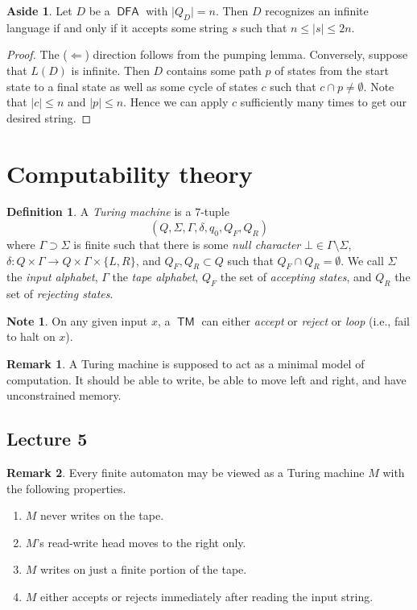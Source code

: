 \documentclass[10pt,letterpaper,cm]{nupset}
\theoremstyle{definition}
\newtheorem*{definition}{Definition}
\newtheorem{note}{Note}
\newtheorem{remark}{Remark}
\newtheorem*{aside}{Aside}
\newcommand{\1}{\mathbf{1}}
\newcommand{\0}{\vec 0}
\DeclareMathOperator{\TM}{\mathsf{TM}}
\DeclareMathOperator{\DFA}{\mathsf{DFA}}
\begin{document}
\begin{aside}
Let $D$ be a $\DFA$ with $\lvert{Q_D}\rvert =n$. Then $D$ recognizes an infinite language if and only if it accepts some string $s$ such that $n\leq \lvert{s}\rvert \leq 2n$.
\end{aside}
\begin{proof}
The ($\Longleftarrow$) direction follows from the pumping lemma. Conversely, suppose that $L(D)$ is infinite. Then $D$ contains some path $p$ of states from the start state to a final state as well as some cycle of states $c$ such that $c \cap p \ne \emptyset$. Note that $\lvert{c}\rvert \leq n$ and $\lvert{p}\rvert \leq n$. Hence we can apply $c$ sufficiently many times to get our desired string.
\end{proof}

\section{Computability theory}

\begin{definition}
A \textit{Turing machine} is a $7$-tuple $$(Q, \Sigma, \Gamma, \delta, q_0, Q_F, Q_R)$$ where $\Gamma \supset \Sigma$ is finite such that there is some \textit{null character} $\bot \in \Gamma \setminus \Sigma$, $\delta : Q\times \Gamma \to Q \times \Gamma \times \{L, R\}$, and $Q_F, Q_R \subset Q$ such that $Q_F \cap Q_R = \emptyset$. We call $\Sigma$ the \textit{input alphabet}, $\Gamma$ the \textit{tape alphabet}, $Q_F$ the set of \textit{accepting states}, and $Q_R$ the set of \textit{rejecting states}.
\end{definition}

\begin{note}
On any given input $x$, a $\TM$ can either \textit{accept} or \textit{reject} or \textit{loop} (i.e., fail to halt on $x$).
\end{note}

\begin{remark}
A Turing machine is supposed to act as a minimal model of computation. It should be able to write, be able to move left and right, and have unconstrained memory.
\end{remark}

\subsection{Lecture 5}

\begin{remark}
Every finite automaton may be viewed as a Turing machine $M$ with the following properties. 
\begin{enumerate}[label=(\alph*)]
\item $M$ never writes on the tape.
\item $M$'s read-write head moves to the right only.
\item $M$ writes on just a finite portion of the tape.
\item $M$ either accepts or rejects immediately after reading the input string. 
\end{enumerate}
\end{remark}
\end{document}
